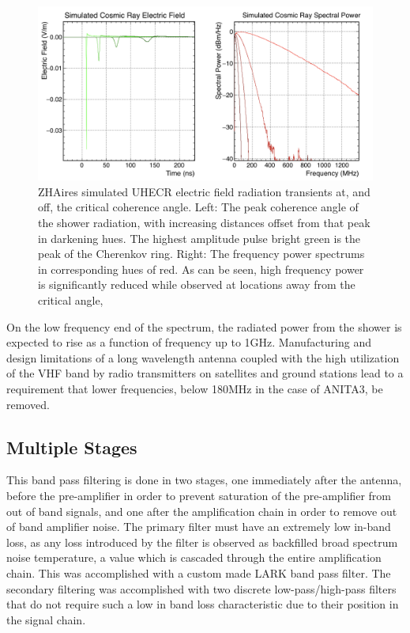 \begin{figure}
\centering
	\includegraphics[width=\textwidth]{figures/CosmicRayOffAngle}
	\caption{ZHAires simulated UHECR electric field radiation transients at, and off, the critical coherence angle.  Left: The peak coherence angle of the shower radiation, with increasing distances offset from that peak in darkening hues.  The highest amplitude pulse bright green is the peak of the Cherenkov ring.  Right: The frequency power spectrums in corresponding hues of red.  As can be seen, high frequency power is significantly reduced while observed at locations away from the critical angle,  }
	\label{fig:CROffAngle}
\end{figure}	

		On the low frequency end of the spectrum, the radiated power from the shower is expected to rise as a function of frequency up to 1GHz.  Manufacturing and design limitations of a long wavelength antenna coupled with the high utilization of the VHF band by radio transmitters on satellites and ground stations lead to a requirement that lower frequencies, below 180MHz in the case of ANITA3, be removed.
		
	\subsection{Multiple Stages}
		This band pass filtering is done in two stages, one immediately after the antenna, before the pre-amplifier in order to prevent saturation of the pre-amplifier from out of band signals, and one after the amplification chain in order to remove out of band amplifier noise.  The primary filter must have an extremely low in-band loss, as any loss introduced by the filter is observed as backfilled broad spectrum noise temperature, a value which is cascaded through the entire amplification chain.  This was accomplished with a custom made LARK band pass filter.  The secondary filtering was accomplished with two discrete low-pass/high-pass filters that do not require such a low in band loss characteristic due to their position in the signal chain.
		
